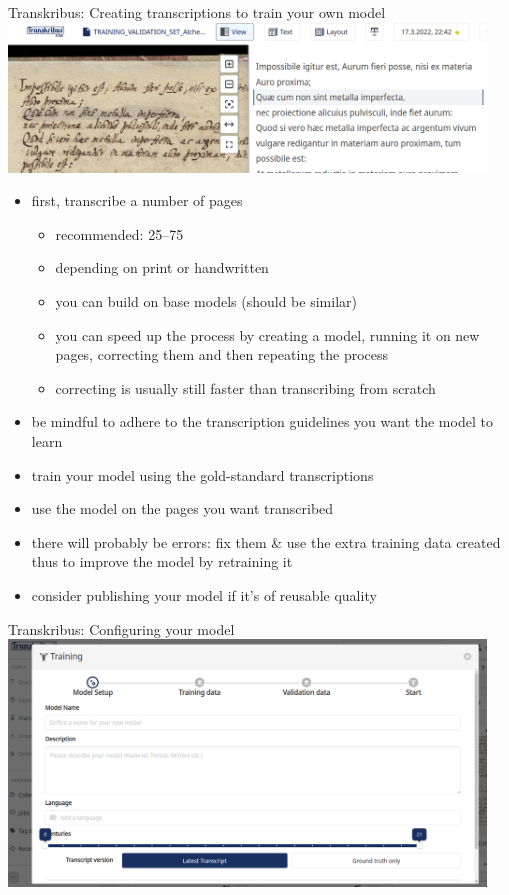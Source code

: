 \begin{frame}{Transkribus: Creating transcriptions to train your own model}
    \includegraphics[width=0.95\textwidth]{img/transkribus-training1.png}
    \begin{itemize}\small
        \item first, transcribe a number of pages 
        \begin{itemize}\footnotesize
            \item recommended: 25--75
            \item depending on print or handwritten
            \item you can build on base models (should be similar)
            \item you can speed up the process by creating a model, running it on new pages, correcting them and then repeating the process
            \item correcting is usually still faster than transcribing from scratch
        \end{itemize}
        \item be mindful to adhere to the transcription guidelines you want the model to learn
        \item train your model using the gold-standard transcriptions
        \item use the model on the pages you want transcribed
        \item there will probably be errors: fix them \& use the extra training data created thus to improve the model by retraining it
        \item consider publishing your model if it's of reusable quality
    \end{itemize}
\end{frame}
\begin{frame}{Transkribus: Configuring your model}
    \includegraphics[width=0.95\textwidth]{img/transkribus-training2.png}
\end{frame}



